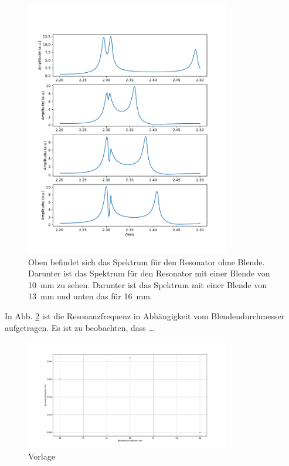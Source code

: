 \begin{figure}
    \centering
    \includegraphics[width=0.8\textwidth]{plots/D_1.pdf}
    \caption{Oben befindet sich das Spektrum für den Resonator ohne Blende. Darunter ist das Spektrum für den Resonator mit einer Blende von \SI{10}{\milli\metre} zu sehen. Darunter ist das Spektrum mit einer Blende von \SI{13}{\milli\metre} und unten das für \SI{16}{\milli\metre}.}
    \label{fig:molek1}
\end{figure}

In Abb. \ref{fig:resonanzen} ist die Resonanzfrequenz in Abhängigkeit vom Blendendurchmesser aufgetragen. Es ist zu beobachten, dass \dots

\begin{figure}
    \centering
    \includegraphics[width=0.8\textwidth]{plots/D_2.pdf}
    \caption{Vorlage}
    \label{fig:resonanzen}
\end{figure}

